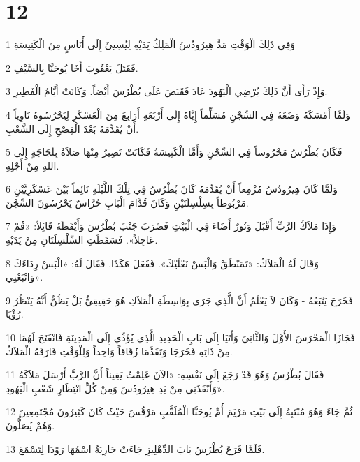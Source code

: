 \chapter{12}

\par 1 وَفِي ذَلِكَ الْوَقْتِ مَدَّ هِيرُودُسُ الْمَلِكُ يَدَيْهِ لِيُسِيئَ إِلَى أُنَاسٍ مِنَ الْكَنِيسَةِ
\par 2 فَقَتَلَ يَعْقُوبَ أَخَا يُوحَنَّا بِالسَّيْفِ.
\par 3 وَإِذْ رَأَى أَنَّ ذَلِكَ يُرْضِي الْيَهُودَ عَادَ فَقَبَضَ عَلَى بُطْرُسَ أَيْضاً. وَكَانَتْ أَيَّامُ الْفَطِيرِ.
\par 4 وَلَمَّا أَمْسَكَهُ وَضَعَهُ فِي السِّجْنِ مُسَلِّماً إِيَّاهُ إِلَى أَرْبَعَةِ أَرَابِعَ مِنَ الْعَسْكَرِ لِيَحْرُسُوهُ نَاوِياً أَنْ يُقَدِّمَهُ بَعْدَ الْفِصْحِ إِلَى الشَّعْبِ.
\par 5 فَكَانَ بُطْرُسُ مَحْرُوساً فِي السِّجْنِ وَأَمَّا الْكَنِيسَةُ فَكَانَتْ تَصِيرُ مِنْهَا صَلاَةٌ بِلَجَاجَةٍ إِلَى اللهِ مِنْ أَجْلِهِ.
\par 6 وَلَمَّا كَانَ هِيرُودُسُ مُزْمِعاً أَنْ يُقَدِّمَهُ كَانَ بُطْرُسُ فِي تِلْكَ اللَّيْلَةِ نَائِماً بَيْنَ عَسْكَرِيَّيْنِ مَرْبُوطاً بِسِلْسِلَتَيْنِ وَكَانَ قُدَّامَ الْبَابِ حُرَّاسٌ يَحْرُسُونَ السِّجْنَ.
\par 7 وَإِذَا مَلاَكُ الرَّبِّ أَقْبَلَ وَنُورٌ أَضَاءَ فِي الْبَيْتِ فَضَرَبَ جَنْبَ بُطْرُسَ وَأَيْقَظَهُ قَائِلاً: «قُمْ عَاجِلاً». فَسَقَطَتِ السِّلْسِلَتَانِ مِنْ يَدَيْهِ.
\par 8 وَقَالَ لَهُ الْمَلاَكُ: «تَمَنْطَقْ وَالْبَسْ نَعْلَيْكَ». فَفَعَلَ هَكَذَا. فَقَالَ لَهُ: «الْبَسْ رِدَاءَكَ وَاتْبَعْنِي».
\par 9 فَخَرَجَ يَتْبَعُهُ - وَكَانَ لاَ يَعْلَمُ أَنَّ الَّذِي جَرَى بِوَاسِطَةِ الْمَلاَكِ هُوَ حَقِيقِيٌّ بَلْ يَظُنُّ أَنَّهُ يَنْظُرُ رُؤْيَا.
\par 10 فَجَازَا الْمَحْرَسَ الأَوَّلَ وَالثَّانِيَ وَأَتَيَا إِلَى بَابِ الْحَدِيدِ الَّذِي يُؤَدِّي إِلَى الْمَدِينَةِ فَانْفَتَحَ لَهُمَا مِنْ ذَاتِهِ فَخَرَجَا وَتَقَدَّمَا زُقَاقاً وَاحِداً وَلِلْوَقْتِ فَارَقَهُ الْمَلاَكُ.
\par 11 فَقَالَ بُطْرُسُ وَهُوَ قَدْ رَجَعَ إِلَى نَفْسِهِ: «الآنَ عَلِمْتُ يَقِيناً أَنَّ الرَّبَّ أَرْسَلَ مَلاَكَهُ وَأَنْقَذَنِي مِنْ يَدِ هِيرُودُسَ وَمِنْ كُلِّ انْتِظَارِ شَعْبِ الْيَهُودِ».
\par 12 ثُمَّ جَاءَ وَهُوَ مُنْتَبِهٌ إِلَى بَيْتِ مَرْيَمَ أُمِّ يُوحَنَّا الْمُلَقَّبِ مَرْقُسَ حَيْثُ كَانَ كَثِيرُونَ مُجْتَمِعِينَ وَهُمْ يُصَلُّونَ.
\par 13 فَلَمَّا قَرَعَ بُطْرُسُ بَابَ الدِّهْلِيزِ جَاءَتْ جَارِيَةٌ اسْمُهَا رَوْدَا لِتَسْمَعَ.
